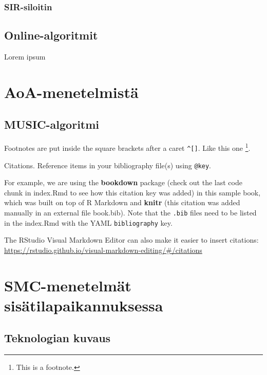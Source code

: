 \documentclass[
  12pt,
  a4paper, twoside]{book}
\theoremstyle{definition}
\theoremstyle{definition}
\theoremstyle{definition}
\theoremstyle{definition}
\theoremstyle{remark}
\begin{document}
\hypertarget{sir-siloitin}{%
\subsection{SIR-siloitin}\label{sir-siloitin}}

\hypertarget{online-algoritmit}{%
\section{Online-algoritmit}\label{online-algoritmit}}

Lorem ipsum

\hypertarget{aoa-menetelmistuxe4}{%
\chapter{AoA-menetelmistä}\label{aoa-menetelmistuxe4}}

\hypertarget{music-algoritmi}{%
\section{MUSIC-algoritmi}\label{music-algoritmi}}

Footnotes are put inside the square brackets after a caret \texttt{\^{}{[}{]}}. Like this one \footnote{This is a footnote.}.

Citations. Reference items in your bibliography file(s) using \texttt{@key}.

For example, we are using the \textbf{bookdown} package \citep{R-bookdown} (check out the last code chunk in index.Rmd to see how this citation key was added) in this sample book, which was built on top of R Markdown and \textbf{knitr} \citep{xie2015} (this citation was added manually in an external file book.bib).
Note that the \texttt{.bib} files need to be listed in the index.Rmd with the YAML \texttt{bibliography} key.

The RStudio Visual Markdown Editor can also make it easier to insert citations: \url{https://rstudio.github.io/visual-markdown-editing/\#/citations}

\hypertarget{smc-menetelmuxe4t-sisuxe4tilapaikannuksessa}{%
\chapter{SMC-menetelmät sisätilapaikannuksessa}\label{smc-menetelmuxe4t-sisuxe4tilapaikannuksessa}}

\hypertarget{teknologian-kuvaus}{%
\section{Teknologian kuvaus}\label{teknologian-kuvaus}}
\end{document}
